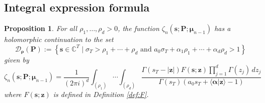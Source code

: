 \documentclass[a4paper,12pt]{article}
\newtheorem{prop}[thm]{Proposition}
\theoremstyle{definition}
\numberwithin{equation}{section}
\newcommand{\dd}{d}
\newcommand{\ii}{i}
\begin{document}
\subsection{Integral expression formula}
\label{subsection:integral_representation_formula}

\begin{prop}
 For all $\rho_1, \ldots, \rho_d>0$, the function $\zeta_{n}(\mathbf{s};\mathbf{P};\boldsymbol{\mu}_{n-1})$ has a holomorphic continuation to the set
$$ \mathcal{D}_{\boldsymbol{\rho}}(\mathbf{P}):=\left\{\mathbf{s} \in \mathbb{C}^T \mid \sigma_T>\rho_1+\cdots +\rho_d \text{ and }a_0\sigma_T+\alpha_1\rho_1+\cdots +\alpha_d\rho_d>1 \right\} $$
given by
\begin{equation}
    \zeta_{n}(\mathbf{s};\mathbf{P};\boldsymbol{\mu}_{n-1}) = \frac{1}{(2 \pi \ii)^d} \int_{(\rho_1)} \cdots \int_{(\rho_d)} \frac{\Gamma(s_T-|\mathbf{z}|)F(\mathbf{s};\mathbf{z}) \prod_{j=1}^d \Gamma(z_j) \, \dd z_j }{\Gamma(s_T)(a_0s_T+\langle \boldsymbol{\alpha}|\mathbf{z} \rangle-1)}  \label{eq:integral_representation_zeta_n}
    \end{equation}
where $F(\mathbf{s};\mathbf{z})$ is defined in Definition \ref{def:F}.
\end{prop}
\end{document}
